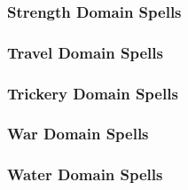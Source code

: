 \subsubsection{Strength Domain Spells}

\begin{spelllist}
    \SLhaste[1]
    \SLenlarge[2]
    \SLmightythrow[3]
    \SLshout[4]
    \SLdivinemight[5]
    \SLseismicslam[6]
    \SLgolemheart[7]
    \SLavatarofmight[8]
    \SLearthquake[9]
\end{spelllist}

\subsubsection{Travel Domain Spells}

\begin{spelllist}
    \SLlongstrider[1]
    \SLdimensionslide[2]
    \SLgaseousform[3]
    \SLairwalk[4]
    \SLshadowstep[5]
    \SLwordofrecall[6]
    \SLavataroftranslocation[7]
    \SLimprisonment[8]
    \SLdimensionalarmy[9]
\end{spelllist}

\subsubsection{Trickery Domain Spells}

\begin{spelllist}
    \SLmaskofthedeceiver[1]
    \SLcreateimage[2]
    \SLinvisibility[3]
    \SLphantasmalkiller[4]
    \SLshadowstep[5]
    \SLshadowwall[6]
    \SLshadowstorm[7]
    \SLmaze[8]
    \SLshadowshield[9]
\end{spelllist}

\subsubsection{War Domain Spells}

\begin{spelllist}
    \SLearthenblade[1]
    \SLflameblade[2]
    \SLaqueousblade[3]
    \SLbladebarrier[4]
    \SLspiritualweapon[5]
    \SLblessedblade[6]
    \SLavatarofshielding[7]
    \SLbladestorm[8]
    \SLavatarofblades[9]
\end{spelllist}

\subsubsection{Water Domain Spells}


